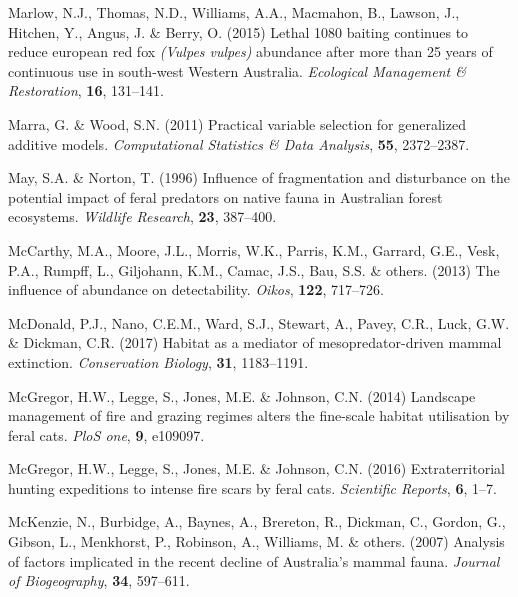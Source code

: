 \documentclass[]{elsarticle} %
\begin{document}
\leavevmode\hypertarget{ref-marlow2015lethal}{}%
Marlow, N.J., Thomas, N.D., Williams, A.A., Macmahon, B., Lawson, J., Hitchen, Y., Angus, J. \& Berry, O. (2015) Lethal 1080 baiting continues to reduce european red fox \emph{(Vulpes vulpes)} abundance after more than 25 years of continuous use in south-west Western Australia. \emph{Ecological Management \& Restoration}, \textbf{16}, 131--141.

\leavevmode\hypertarget{ref-marra2011practical}{}%
Marra, G. \& Wood, S.N. (2011) Practical variable selection for generalized additive models. \emph{Computational Statistics \& Data Analysis}, \textbf{55}, 2372--2387.

\leavevmode\hypertarget{ref-may1996influence}{}%
May, S.A. \& Norton, T. (1996) Influence of fragmentation and disturbance on the potential impact of feral predators on native fauna in Australian forest ecosystems. \emph{Wildlife Research}, \textbf{23}, 387--400.

\leavevmode\hypertarget{ref-mccarthy2013influence}{}%
McCarthy, M.A., Moore, J.L., Morris, W.K., Parris, K.M., Garrard, G.E., Vesk, P.A., Rumpff, L., Giljohann, K.M., Camac, J.S., Bau, S.S. \& others. (2013) The influence of abundance on detectability. \emph{Oikos}, \textbf{122}, 717--726.

\leavevmode\hypertarget{ref-mcdonald2017habitat}{}%
McDonald, P.J., Nano, C.E.M., Ward, S.J., Stewart, A., Pavey, C.R., Luck, G.W. \& Dickman, C.R. (2017) Habitat as a mediator of mesopredator-driven mammal extinction. \emph{Conservation Biology}, \textbf{31}, 1183--1191.

\leavevmode\hypertarget{ref-mcgregor2014landscape}{}%
McGregor, H.W., Legge, S., Jones, M.E. \& Johnson, C.N. (2014) Landscape management of fire and grazing regimes alters the fine-scale habitat utilisation by feral cats. \emph{PloS one}, \textbf{9}, e109097.

\leavevmode\hypertarget{ref-mcgregor2016extraterritorial}{}%
McGregor, H.W., Legge, S., Jones, M.E. \& Johnson, C.N. (2016) Extraterritorial hunting expeditions to intense fire scars by feral cats. \emph{Scientific Reports}, \textbf{6}, 1--7.

\leavevmode\hypertarget{ref-mckenzie2007analysis}{}%
McKenzie, N., Burbidge, A., Baynes, A., Brereton, R., Dickman, C., Gordon, G., Gibson, L., Menkhorst, P., Robinson, A., Williams, M. \& others. (2007) Analysis of factors implicated in the recent decline of Australia's mammal fauna. \emph{Journal of Biogeography}, \textbf{34}, 597--611.
\end{document}
